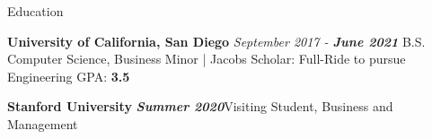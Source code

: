 \documentclass{resume} %
\begin{document}

\begin{rSection}{\faUniversity{ }}{Education}

\begin{rSubsection}{}
{\bf University of California, San Diego} {\em September 2017 - \bf{June 2021}} 
{B.S. Computer Science, Business Minor | Jacobs Scholar: Full-Ride to pursue Engineering} { GPA: \bf{3.5}}
\end{rSubsection}

\begin{rSubsection}{}
{\bf Stanford University} {\em \textbf{Summer 2020}}{Visiting Student, Business and Management} {}
\end{rSubsection}
\end{rSection}

\end{document}
